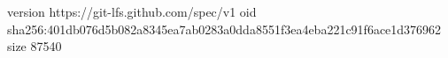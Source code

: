 version https://git-lfs.github.com/spec/v1
oid sha256:401db076d5b082a8345ea7ab0283a0dda8551f3ea4eba221c91f6ace1d376962
size 87540
